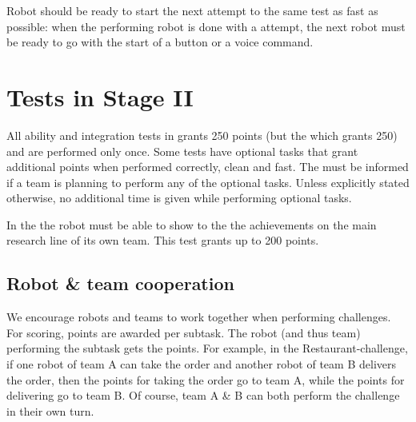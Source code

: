 \documentclass[11pt, twoside, openright, a4paper, chapterprefix]{scrbook}
\begin{document}
Robot should be ready to start the next attempt to the same test as fast as possible: 
  when the performing robot is done with a attempt, the next robot must be ready to go with the start of a button or a voice command.

\newpage


\newpage


% 

\newpage


\newpage


\newpage


\chapter{Tests in Stage II}
\label{chap:stage_II}

\begin{itshape}
All ability and integration tests in  grants 250 points (but the  which grants 250) and are performed only once. Some tests have optional tasks that grant additional points when performed correctly, clean and fast. The  must be informed if a team is planning to perform any of the optional tasks. Unless explicitly stated otherwise, no additional time is given while performing optional tasks.

In the  the robot must be able to show to the  the achievements on the main research line of its own team. This test grants up to 200 points.

\section{Robot \& team cooperation}
We encourage robots and teams to work together when performing challenges.
For scoring, points are awarded per subtask. The robot (and thus team) performing the subtask gets the points.
For example, in the Restaurant-challenge, if one robot of team A can take the order and another robot of team B delivers the order, then the points for taking the order go to team A, while the points for delivering go to team B. 
Of course, team A \& B can both perform the challenge in their own turn.

\end{itshape}

\newpage


\newpage


\newpage


\newpage


\newpage




\printabx
\printidx
\end{document}
